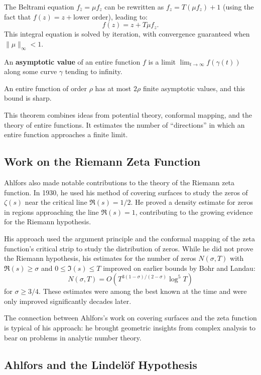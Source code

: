 The Beltrami equation $f_{\bar z} = \mu f_z$ can be rewritten as $f_z = T(\mu f_z) + 1$ (using the fact that $f(z) = z + \text{lower order}$), leading to:
\[
f(z) = z + T\mu f_z.
\]
This integral equation is solved by iteration, with convergence guaranteed when $\|\mu\|_\infty < 1$.

An \textbf{asymptotic value} of an entire function $f$ is a limit $\lim_{t \to \infty} f(\gamma(t))$ along some curve $\gamma$ tending to infinity.

\begin{theorem}
An entire function of order $\rho$ has at most $2\rho$ finite asymptotic values, and this bound is sharp.
\end{theorem}

This theorem combines ideas from potential theory, conformal mapping, and the theory of entire functions. It estimates the number of ``directions'' in which an entire function approaches a finite limit.

\subsection{Work on the Riemann Zeta Function}

Ahlfors also made notable contributions to the theory of the Riemann zeta function. In 1930, he used his method of covering surfaces to study the zeros of $\zeta(s)$ near the critical line $\Re(s) = 1/2$. He proved a density estimate for zeros in regions approaching the line $\Re(s) = 1$, contributing to the growing evidence for the Riemann hypothesis.

His approach used the argument principle and the conformal mapping of the zeta function's critical strip to study the distribution of zeros. While he did not prove the Riemann hypothesis, his estimates for the number of zeros $N(\sigma, T)$ with $\Re(s) \geq \sigma$ and $0 \leq \Im(s) \leq T$ improved on earlier bounds by Bohr and Landau:
\[
N(\sigma, T) = O(T^{3(1-\sigma)/(2-\sigma)} \log^5 T)
\]
for $\sigma \geq 3/4$. These estimates were among the best known at the time and were only improved significantly decades later.

The connection between Ahlfors's work on covering surfaces and the zeta function is typical of his approach: he brought geometric insights from complex analysis to bear on problems in analytic number theory.

\subsection{Ahlfors and the Lindel{\"o}f Hypothesis}

